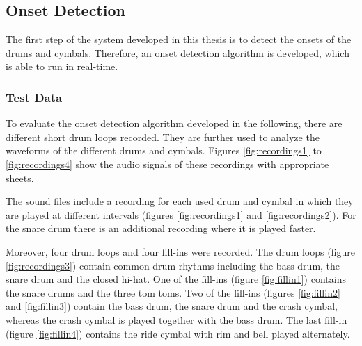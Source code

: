 \subsection{Onset Detection} \label{section:onsetdetectionmethod}

The first step of the system developed in this thesis is to detect the onsets of the drums and cymbals. Therefore, an onset detection algorithm is developed, which is able to run in real-time.

\subsubsection{Test Data}

To evaluate the onset detection algorithm developed in the following, there are different short drum loops recorded. They are further used to analyze the waveforms of the different drums and cymbals. Figures \ref{fig:recordings1} to \ref{fig:recordings4} show the audio signals of these recordings with appropriate sheets. 

The sound files include a recording for each used drum and cymbal in which they are played at different intervals (figures \ref{fig:recordings1} and \ref{fig:recordings2}). For the snare drum there is an additional recording where it is played faster. 

Moreover, four drum loops and four fill-ins were recorded. The drum loops (figure \ref{fig:recordings3}) contain common drum rhythms including the bass drum, the snare drum and the closed hi-hat. One of the fill-ins (figure \ref{fig:fillin1}) contains the snare drums and the three tom toms. Two of the fill-ins (figures \ref{fig:fillin2} and \ref{fig:fillin3}) contain the bass drum, the snare drum and the crash cymbal, whereas the crash cymbal is played together with the bass drum. The last fill-in (figure \ref{fig:fillin4}) contains the ride cymbal with rim and bell played alternately.

